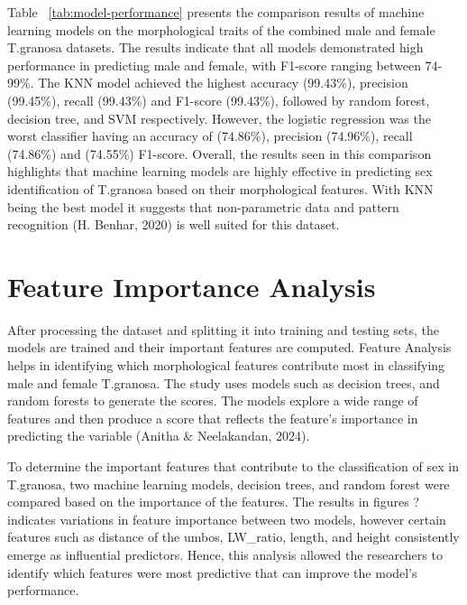 Table ~\ref{tab:model-performance} presents the comparison results of machine learning models on the morphological traits of the combined  male and female T.granosa datasets. The results indicate that all models demonstrated high performance in predicting male and female, with F1-score ranging between 74-99\%. The KNN model achieved the highest accuracy (99.43\%), precision (99.45\%), recall (99.43\%) and F1-score (99.43\%), followed by random forest, decision tree, and SVM respectively. However, the logistic regression was the worst classifier having an accuracy of (74.86\%), precision (74.96\%), recall (74.86\%) and (74.55\%) F1-score. Overall, the results seen in this comparison highlights that machine learning models are highly effective in predicting sex identification of T.granosa based on their morphological features. With KNN being the best model it suggests that non-parametric data and pattern recognition (H. Benhar, 2020) is well suited for this dataset. 

\section{Feature Importance Analysis}
After processing the dataset and splitting it into training and testing sets, the models are trained and their important features are computed. Feature Analysis helps in identifying which morphological features contribute most in classifying male and female T.granosa. The study uses models such as decision trees, and random forests to generate the scores. The models explore a wide range of features and then produce a score that reflects the feature’s importance in predicting the variable (Anitha \& Neelakandan, 2024).  

To determine the important features that contribute to the classification of sex in T.granosa, two machine learning models, decision trees, and random forest were compared based on the importance of the features. The results in figures ?  indicates variations in feature importance between two models, however certain features such as distance of the umbos, LW\_ratio, length, and height consistently emerge as influential predictors. Hence, this analysis allowed the researchers to identify which features were most predictive that can improve the model’s performance. 

